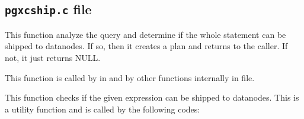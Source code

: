 \subsection{\label{pgxc:FQS}\texttt{pgxcship.c} file}

  
      This function analyze the query and determine if the whole statement can be
      shipped to datanodes.   If so, then it creates a plan and returns to the caller.
      If not, it just returns NULL.
      
      This function is called by  in 
      and by other functions internally in  file.
  
  
      This function checks if the given expression can be shipped to datanodes.
      This is a utility function and is called by the following codes:
      
